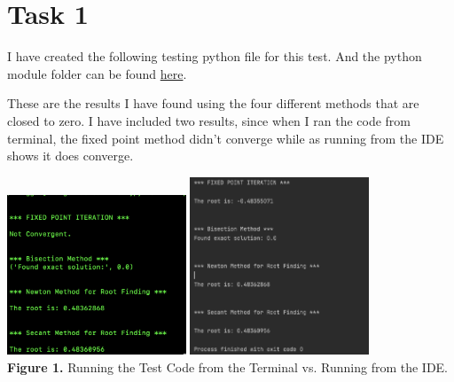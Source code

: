 \documentclass{article}
\begin{document}
\section*{Task 1}
I have created the following testing python file for this test. And the python module folder can be found \href{https://github.com/GoByMark/math4610/tree/main/Homework_Tasks/Tasksheet_06/src/Task_1/mypythonlib}{here}.

These are the results I have found using the four different methods that are closed to zero. I have included two results, since when I ran the code from terminal, the fixed point method didn't converge while as running from the IDE shows it does converge.
\begin{center}
\includegraphics[width=0.4\textwidth]{Screenshots/Task_1.1.png}
\includegraphics[width=0.4\textwidth]{Screenshots/Task_1.2.png}\\
{\bf Figure 1.} Running the Test Code from the Terminal vs. Running from the IDE.
\end{center}
\end{document}
